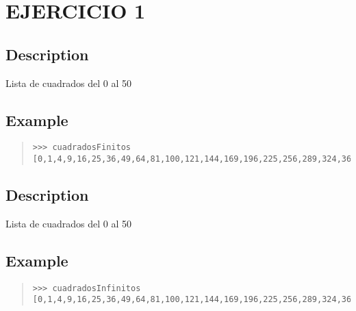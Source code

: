 \section{EJERCICIO 1}
\begin{haddockdesc}
\item[\begin{tabular}{@{}l}
cuadradosFinitos :: {\char 91}Integer{\char 93}
\end{tabular}]
{\haddockbegindoc
\section*{Description}
Lista de cuadrados del 0 al 50\par
\subsection*{Example}
\begin{quote}
{\haddockverb\begin{verbatim}
>>> cuadradosFinitos
[0,1,4,9,16,25,36,49,64,81,100,121,144,169,196,225,256,289,324,361,400,441,484,529,576,625,676,729,784,841,900,961,1024,1089,1156,1225,1296,1369,1444,1521,1600,1681,1764,1849,1936,2025,2116,2209,2304,2401,2500]

\end{verbatim}}
\end{quote}}
\end{haddockdesc}
\begin{haddockdesc}
\item[\begin{tabular}{@{}l}
cuadradosInfinitos :: {\char 91}Integer{\char 93}
\end{tabular}]
{\haddockbegindoc
\section*{Description}
Lista de cuadrados del 0 al 50\par
\subsection*{Example}
\begin{quote}
{\haddockverb\begin{verbatim}
>>> cuadradosInfinitos
[0,1,4,9,16,25,36,49,64,81,100,121,144,169,196,225,256,289,324,361,400,441,484,529,576,625,676,729,784,841,900,961,1024,1089,1156,1225,1296,1369,1444,1521,1600,1681,1764,1849,1936,2025,2116,2209,2304,2401,2500]

\end{verbatim}}
\end{quote}}
\end{haddockdesc}
